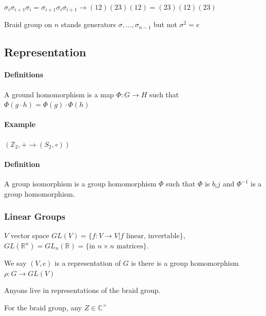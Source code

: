 \documentclass[a4paper,oneside,11pt]{article}
\begin{document}
$\sigma_i\sigma_{i+1}\sigma_i=\sigma_{i+1}\sigma_i\sigma_{i+1} \rightarrow (12)(23)(12)=(23)(12)(23)$

Braid group on $n$ stands generators $\sigma,\dots,\sigma_{n-1}$ but not $\sigma^2=e$

\subsection{Representation}
\paragraph{Definitions}
A ground homomorphism is a map $\Phi: G\to H$ such that $\Phi(g\cdot h)=\Phi(g)\cdot\Phi(h)$

\paragraph{Example}
$(\mathbb{Z}_2,+\to(S_2,\circ))$

\paragraph{Definition}
A group isomorphism is a group homomorphism $\Phi$ such that $\Phi$ is $b_ij$ and $\Phi^{-1}$ is a group homomorphism.

\subsubsection{Linear Groups}
$V$ vector space $GL(V)=\{f:V\to V|f\text{ linear, invertable}\}$, $GL(\mathbb{R}^n)=GL_n(\mathbb{R})=\{\text{in $n\times n$ matrices}\}$.

We say $(V,e)$ is a representation of $G$ is there is a group homomorphism $\rho: G\to GL(V)$

Anyons live in representations of the braid group.

For the braid group, any $Z\in\mathbb{C}^{\times}$
\end{document}
